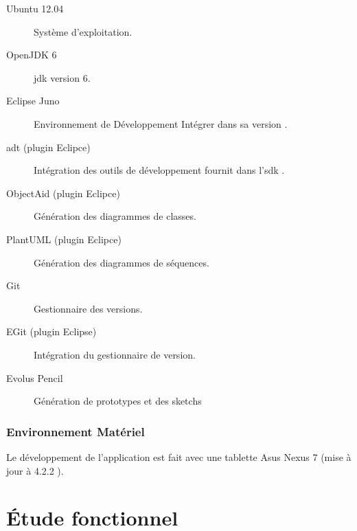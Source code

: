 \begin{description}

\item [Ubuntu 12.04] Système d'exploitation.\footnotemark[1]

\item [OpenJDK 6] \gls{jdk} version 6.\footnotemark[2]

\item [Eclipse Juno] Environnement de Développement Intégrer dans sa version .\footnotemark[3]

\item [\gls{adt} (plugin Eclipce)] Intégration des outils de développement fournit dans l'\gls{sdk} \android{}.\footnotemark[4]

\item [ObjectAid (plugin Eclipce)] Génération des diagrammes de classes.\footnotemark[5]

\item [PlantUML (plugin Eclipce)] Génération des diagrammes de séquences.\footnotemark[6]

\item [Git] Gestionnaire des versions\footnotemark[7].

\item [EGit (plugin Eclipse)] Intégration du gestionnaire de version.\footnotemark[8]

\item [Evolus Pencil] Génération de prototypes et des sketchs\footnotemark[9]
\end{description}


\subsubsection{Environnement Matériel}

Le développement de l'application est fait avec une tablette Asus Nexus 7 (mise à jour à \android{} 4.2.2 ).

\section{Étude fonctionnel}


